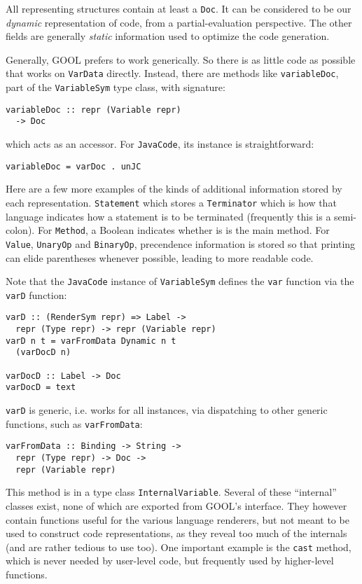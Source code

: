 \documentclass[sigplan,review,anonymous,prologue,dvipsnames]{acmart}
\begin{document}
All representing structures contain at least a \verb|Doc|. It can be considered
to be our \emph{dynamic} representation of code, from a partial-evaluation
perspective. The other fields are generally \emph{static} information used to
optimize the code generation.

Generally, GOOL prefers to work generically. So there is as little code as
possible that works on \verb|VarData| directly.  Instead, there are
methods like \verb|variableDoc|, part of the \verb|VariableSym| type class,
with signature:
\begin{lstlisting}
variableDoc :: repr (Variable repr)
  -> Doc
\end{lstlisting}
which acts as an accessor.  For \verb|JavaCode|, its instance is
straightforward:
\begin{lstlisting}
variableDoc = varDoc . unJC
\end{lstlisting}

Here are a few more examples of the kinds of additional information stored by
each representation. \verb|Statement| which stores a
\verb|Terminator| which is how that language indicates how a statement is to be
terminated (frequently this is a semi-colon).  For \verb|Method|, a Boolean
indicates whether is is the main method.  For \verb|Value|, \verb|UnaryOp|
and \verb|BinaryOp|, precendence information is stored so that printing can
elide parentheses whenever possible, leading to more readable code.

Note that the \verb|JavaCode| instance of \verb|VariableSym| defines the
\verb|var| function via the \verb|varD| function:
\begin{lstlisting}
varD :: (RenderSym repr) => Label ->
  repr (Type repr) -> repr (Variable repr)
varD n t = varFromData Dynamic n t
  (varDocD n)

varDocD :: Label -> Doc
varDocD = text
\end{lstlisting}
\verb|varD| is generic, i.e. works for all instances, via dispatching to other
generic functions, such as \verb|varFromData|:
\begin{lstlisting}
varFromData :: Binding -> String ->
  repr (Type repr) -> Doc ->
  repr (Variable repr)
\end{lstlisting}
This method is in a type class \verb|InternalVariable|. Several of these
``internal'' classes exist, none of which are exported from GOOL's interface.
They however contain functions useful for the various language renderers, but
not meant to be used to construct code representations, as they reveal too
much of the internals (and are rather tedious to use too).  One important
example is the \verb|cast| method, which is never needed by user-level code,
but frequently used by higher-level functions.
\end{document}

